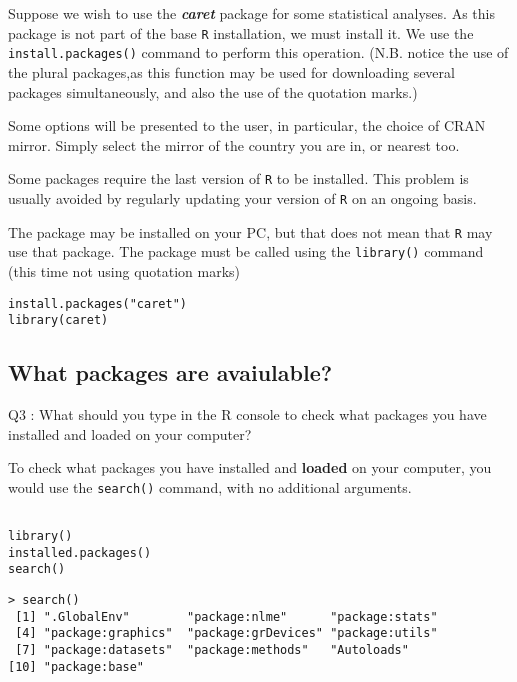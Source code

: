 \documentclass[11pt]{article} %
\begin{document}
Suppose we wish to use the \textbf{\emph{caret}} package for some statistical analyses.
As this package is not part of the base \texttt{R} installation, we must install it. 
We use the \texttt{install.packages()} command to perform this operation. (N.B. notice the use of the plural packages,as this function may be used for downloading several packages simultaneously, and also the use of the quotation marks.)
\bigskip

Some options will be presented to the user, in particular, the choice of CRAN mirror. 
Simply select the mirror of the country you are in, or nearest too.
\bigskip

Some packages require the last version of \texttt{R} to be installed. This problem is usually avoided by regularly updating your version of \texttt{R} on an ongoing basis.
\bigskip

The package may be installed on your PC, but that does not mean that \texttt{R} may use that package. The package must be called using the \texttt{library()} command (this time not using quotation marks)


\begin{framed}
\begin{verbatim}
install.packages("caret")
library(caret)
\end{verbatim}
\end{framed}


\subsection{What packages are avaiulable?}
Q3 : What should you type in the R console to check what packages you have installed and loaded on your computer?

To check what packages you have installed and \textbf{loaded} on your computer, you would use the \texttt{search()} command, with no additional arguments.

\begin{framed}
\begin{verbatim}

library()
installed.packages()
search()
\end{verbatim}
\end{framed}

\begin{verbatim}
> search()
 [1] ".GlobalEnv"        "package:nlme"      "package:stats"    
 [4] "package:graphics"  "package:grDevices" "package:utils"    
 [7] "package:datasets"  "package:methods"   "Autoloads"        
[10] "package:base" 
\end{verbatim}
\end{document}
